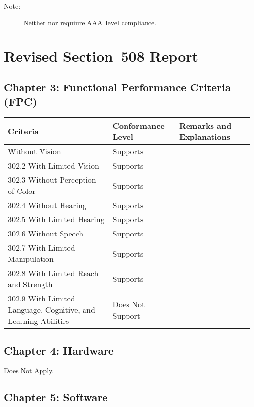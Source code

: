 \documentclass{report}
\begin{document}
\begin{description}
\item[Note:] Neither  nor  requiure
  AAA~level compliance.
\end{description}

\clearpage
\section{Revised Section~508 Report}
\label{sec:sec508}

\subsection{Chapter 3: Functional Performance Criteria (FPC)}
\label{sec:508-3}


\begin{longtable}{p{}<{\RaggedRight}p{}<{\RaggedRight}p{}<{\RaggedRight}}
  \toprule
  Criteria & Conformance Level & Remarks and Explanations \\
  \midrule
  \endhead
  \bottomrule
  \endfoot
  302.1 Without Vision
           & Supports \\ 
  302.2 With Limited Vision & Supports\\
  302.3 Without Perception of Color & Supports\\
  302.4 Without Hearing & Supports\\
  302.5 With Limited Hearing & Supports\\
  302.6 Without Speech & Supports\\
  302.7 With Limited Manipulation & Supports\\
  302.8 With Limited Reach and Strength & Supports\\
  302.9 With Limited Language, Cognitive, and Learning Abilities
           &
             Does Not Support\\                                                                   
\end{longtable}


\subsection{Chapter 4: Hardware}
\label{sec:508-4}


Does Not Apply.

\subsection{Chapter 5: Software}
\label{sec:508-5}
\end{document}

